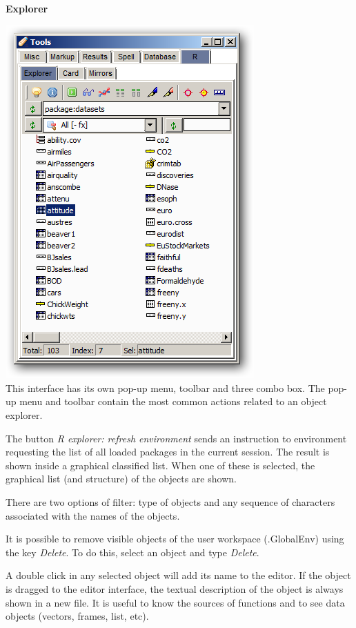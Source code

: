 \paragraph{}\textbf{Explorer}\\

\includegraphics[scale=0.50]{./res/tools_r_explorer.png} \\

This interface has its own pop-up menu, toolbar and three combo box.
The pop-up menu and toolbar contain the most common actions related to an object explorer.

The button \textit{R explorer: refresh environment} sends an instruction to
\RR{} environment requesting the list of all loaded packages in the current
session. The result is shown inside a graphical classified list. When one
of these is selected, the graphical list (and structure) of the objects
are shown.

There are two options of filter: type of objects and any sequence of
characters associated with the names of the objects.

It is possible to remove visible objects of the user workspace (.GlobalEnv)
using the key \textit{Delete}. To do this, select an object and type
\textit{Delete}.

A double click in any selected object will add its name to the editor.
If the object is dragged to the editor interface, the textual description
of the object is always shown in a new file. It is useful to know the
sources of functions and to see data objects (vectors, frames, list, etc).

